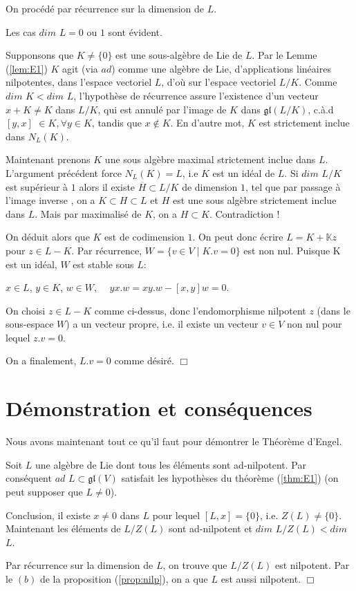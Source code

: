 \documentclass[a4paper,openany,12pt]{report}
\newcommand{\KK}{\mathbb{K}}
\newcommand{\gl}{\mathfrak{gl}}
\theoremstyle{break}
{\theorembodyfont{\upshape}
\newtheorem*{rmq}{Remarque :}
\newtheorem*{prv}{Preuve :}
\newtheorem*{ex}{Exemples :}
\newtheorem*{exe}{Exemple : }
\newtheorem*{nota}{Notation :}
\newtheorem*{dem}{D\'emonstration :}}
\begin{document}
\begin{dem}
\quad On procédé par récurrence sur la dimension de $L$.

Les cas $dim$ $L = 0$ ou $1$ sont évident.

Supponsons que $K \neq \{0\}$ est une sous-algèbre de Lie de $L$. Par le Lemme (\ref{lem:E1}) $K$ agit (via $ad$) comme une algèbre de Lie, d'applications linéaires nilpotentes, dans l'espace vectoriel $L$, d'où sur l'espace vectoriel $L/K$. Comme $dim$ $K < dim$ $L$, l'hypothèse de récurrence assure l’existence d'un vecteur $x + K \neq K $ dans $L/K$, qui est annulé par l'image de $K$ dans $\gl(L/K)$, c.à.d $[y,x]$ $\in K, \forall y \in K$, tandis que $x \notin K$. En d'autre mot, $K$ est strictement inclue dans $N_{L}(K)$.

Maintenant prenons $K$ une sous algèbre maximal strictement inclue dans $L$. L'argument précédent force $N_{L}(K) = L$, i.e $K$ est un idéal de $L$. Si $dim$ $L/K$ est supérieur à $1$ alors il existe $\overline{H} \subset L/K$ de dimension $1$, tel que par passage à l'image inverse , on a $K \subset H \subset L$ et $H$ est une sous algèbre strictement inclue dans $L$. Mais par maximalisé de $K$, on a $H \subset K$. Contradiction !

On déduit alors que $K$ est de codimension $1$. On peut donc écrire $L=K+ \KK z$ pour $z \in L-K$. Par récurrence, $W = \{ v \in V \mid K.v = 0\}$ est non nul. Puisque K est un idéal, $W$ est stable sous $L$: 
\begin{center}
$x \in L$, $y \in K$, $w \in W$, $\quad yx.w = xy.w - [x,y]w =0$.
\end{center}
\quad On choisi $z \in L-K$ comme ci-dessus, donc l'endomorphisme nilpotent $z$ (dans le sous-espace $W$) a un vecteur propre, i.e. il existe un vecteur $v \in V$ non nul pour lequel $z.v = 0$.

On a finalement, $L.v = 0$ comme désiré. $\Box$
\end{dem}

\section{Démonstration et conséquences}

Nous avons maintenant tout ce qu'il faut pour démontrer le Théorème d'Engel.

\begin{dem}
\quad Soit $L$ une algèbre de Lie dont tous les éléments sont ad-nilpotent. Par conséquent $ad$ $L \subset \gl(V)$  satisfait les hypothèses du théorème (\ref{thm:E1}) (on peut supposer que $L \neq 0$).

Conclusion, il existe $x \neq 0$ dans $L$ pour lequel $[L,x]=\{0\}$, i.e. $Z(L) \neq \{0\}$. Maintenant les éléments de $L/Z(L)$ sont ad-nilpotent et $dim$ $L/Z(L) < dim$ $L$.

Par récurrence sur la dimension de $L$, on  trouve que $L/Z(L)$ est nilpotent. Par le $(b)$ de la proposition (\ref{prop:nilp}), on a que $L$ est aussi nilpotent. $\Box$
\end{dem}
\end{document}
